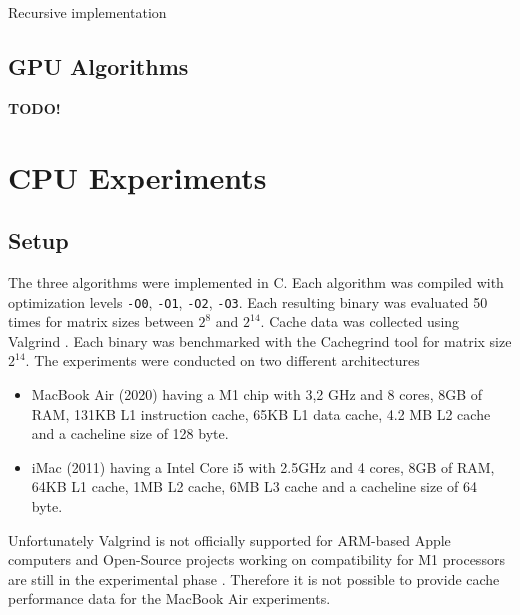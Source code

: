 \documentclass[conference]{IEEEtran}
\begin{document}
    \begin{algorithm}
        \BlankLine
        \caption{Recursive implementation}
        \label{fig:rec_implementation}        
    \end{algorithm}

    \subsection{GPU Algorithms}
    \textbf{TODO!}\\

    \section{CPU Experiments} \label{sec:experiments}
    \subsection{Setup}
    The three algorithms were implemented in C. Each algorithm was compiled with optimization levels \texttt{-O0}, \texttt{-O1}, \texttt{-O2}, \texttt{-O3}. Each resulting binary was evaluated 50 times for matrix sizes between $2^8$ and $2^{14}$. Cache data was collected using Valgrind \cite{valgrind}. Each binary was benchmarked with the Cachegrind tool for matrix size $2^{14}$. The experiments were conducted on two different architectures
    \begin{itemize}
        \item MacBook Air (2020) having a M1 chip with 3,2 GHz and 8 cores, 8GB of RAM, 131KB L1 instruction cache, 65KB L1 data cache, 4.2 MB L2 cache and a cacheline size of 128 byte.
        \item iMac (2011) having a Intel Core i5 with 2.5GHz and 4 cores, 8GB of RAM, 64KB L1 cache, 1MB L2 cache, 6MB L3 cache and a cacheline size of 64 byte.
    \end{itemize}
    Unfortunately Valgrind is not officially supported for ARM-based Apple computers \cite{valgrinddocs} and Open-Source projects working on compatibility for M1 processors are still in the experimental phase \cite{valgrindm1bug}. Therefore it is not possible to provide cache performance data for the MacBook Air experiments. 
\end{document}
